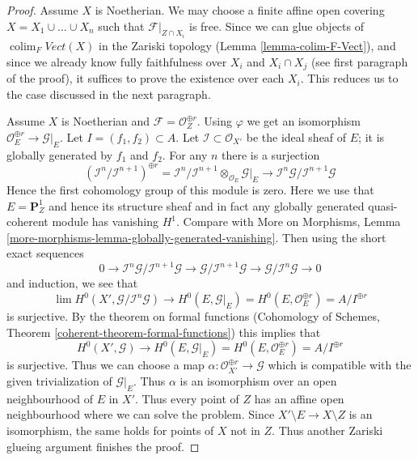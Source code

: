 \documentclass[10pt,a4paper]{amsart}
\theoremstyle{plain}
\theoremstyle{definition}
\theoremstyle{remark}
\numberwithin{equation}{subsection}
\def\lim{\mathop{\mathrm{lim}}\nolimits}
\def\colim{\mathop{\mathrm{colim}}\nolimits}
\begin{document}
\begin{proof}
\medskip\noindent
Assume $X$ is Noetherian. We may choose a finite affine open covering
$X = X_1 \cup \ldots \cup X_n$ such that $\mathcal{F}|_{Z \cap X_i}$ is free.
Since we can glue objects of $\colim_F \textit{Vect}(X)$
in the Zariski topology (Lemma \ref{lemma-colim-F-Vect}), and
since we already know
fully faithfulness over $X_i$ and $X_i \cap X_j$ (see first paragraph
of the proof), it suffices to prove the existence over each $X_i$.
This reduces us to the case discussed in the next paragraph.

\medskip\noindent
Assume $X$ is Noetherian and $\mathcal{F} = \mathcal{O}_Z^{\oplus r}$.
Using $\varphi$ we get an isomorphism
$\mathcal{O}_E^{\oplus r} \to \mathcal{G}|_E$.
Let $I = (f_1, f_2) \subset A$.
Let $\mathcal{I} \subset \mathcal{O}_{X'}$
be the ideal sheaf of $E$; it is globally generated by $f_1$ and $f_2$.
For any $n$ there is a surjection
$$
(\mathcal{I}^n/\mathcal{I}^{n + 1})^{\oplus r} =
\mathcal{I}^n/\mathcal{I}^{n + 1} \otimes_{\mathcal{O}_E}
\mathcal{G}|_E \longrightarrow
\mathcal{I}^n\mathcal{G}/\mathcal{I}^{n + 1}\mathcal{G}
$$
Hence the first cohomology group of this module is zero.
Here we use that $E = \mathbf{P}^1_Z$ and hence its structure
sheaf and in fact any globally generated quasi-coherent module
has vanishing $H^1$. Compare with More on Morphisms, Lemma
\ref{more-morphisms-lemma-globally-generated-vanishing}.
Then using the short exact sequences
$$
0 \to  \mathcal{I}^n\mathcal{G}/\mathcal{I}^{n + 1}\mathcal{G} \to
\mathcal{G}/\mathcal{I}^{n + 1}\mathcal{G} \to
\mathcal{G}/\mathcal{I}^n\mathcal{G} \to 0
$$
and induction, we see that
$$
\lim H^0(X', \mathcal{G}/\mathcal{I}^n\mathcal{G})
\to
H^0(E, \mathcal{G}|_E) = H^0(E, \mathcal{O}_E^{\oplus r}) =
A/I^{\oplus r}
$$
is surjective. By the theorem on formal functions
(Cohomology of Schemes, Theorem \ref{coherent-theorem-formal-functions})
this implies that
$$
H^0(X', \mathcal{G}) \to
H^0(E, \mathcal{G}|_E) = H^0(E, \mathcal{O}_E^{\oplus r}) =
A/I^{\oplus r}
$$
is surjective. Thus we can choose a map
$\alpha : \mathcal{O}_{X'}^{\oplus r} \to \mathcal{G}$
which is compatible with the given trivialization
of $\mathcal{G}|_E$. Thus $\alpha$ is an isomorphism over
an open neighbourhood of $E$ in $X'$. Thus every point
of $Z$ has an affine open neighbourhood where
we can solve the problem. Since $X' \setminus E \to X \setminus Z$
is an isomorphism, the same holds for points of $X$ not in $Z$.
Thus another Zariski glueing argument finishes the proof.
\end{proof}
\end{document}
